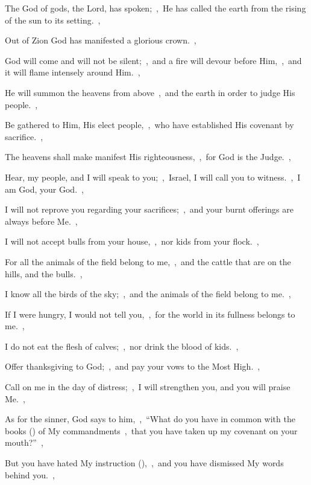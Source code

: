 \documentclass[12pt,twoside,a5paper]{article}
\begin{document}
\begin{normalparskip}
  The God of gods, the Lord, has spoken;~\sep\ He has called the earth from the rising of the sun to its setting.~\sep


  Out of Zion God has manifested a glorious crown.~\sep

  God will come and will not be silent;~\sep\ and a fire will devour before Him,~\sep\ and it will flame intensely around Him.~\sep

  He will summon the heavens from above~\sep\ and the earth in order to judge His people.~\sep

  Be gathered to Him, His elect people,~\sep\ who have established His covenant by sacrifice.~\sep

  The heavens shall make manifest His righteousness,~\sep\ for God is the Judge.~\sep

  Hear, my people, and I will speak to you;~\sep\ Israel, I will call you to witness.~\sep\ I am God, your God.~\sep

  I will not reprove you regarding your sacrifices;~\sep\ and your burnt offerings are always before Me.~\sep

  I will not accept bulls from your house,~\sep\ nor kids from your flock.~\sep

  For all the animals of the field belong to me,~\sep\ and the cattle that are on the hills, and the bulls.~\sep

  I know all the birds of the sky;~\sep\ and the animals of the field belong to me.~\sep

  If I were hungry, I would not tell you,~\sep\ for the world in its fullness belongs to me.~\sep

  I do not eat the flesh of calves;~\sep\ nor drink the blood of kids.~\sep

  Offer thanksgiving to God;~\sep\ and pay your vows to the Most High.~\sep

  Call on me in the day of distress;~\sep\ I will strengthen you, and you will praise Me.~\sep

  As for the sinner, God says to him,~\sep\ ``What do you have in common with the books () of My commandments~\sep\ that you have taken up my covenant on your mouth?''~\sep

  But you have hated My instruction (),~\sep\ and you have dismissed My words behind you.~\sep


\end{normalparskip}
\end{document}

